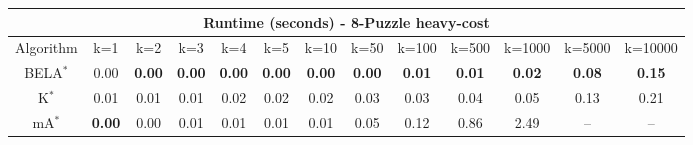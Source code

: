 \begin{tabular}{c|cccccccccccc}\toprule
\multicolumn{13}{c}{Runtime (seconds) - 8-Puzzle heavy-cost}\\ \midrule
Algorithm & k=1 & k=2 & k=3 & k=4 & k=5 & k=10 & k=50 & k=100 & k=500 & k=1000 & k=5000 & k=10000 \\ \midrule
BELA$^*$ & 0.00 & \textbf{0.00} & \textbf{0.00} & \textbf{0.00} & \textbf{0.00} & \textbf{0.00} & \textbf{0.00} & \textbf{0.01} & \textbf{0.01} & \textbf{0.02} & \textbf{0.08} & \textbf{0.15} \\
K$^*$ & 0.01 & 0.01 & 0.01 & 0.02 & 0.02 & 0.02 & 0.03 & 0.03 & 0.04 & 0.05 & 0.13 & 0.21 \\
mA$^*$ & \textbf{0.00} & 0.00 & 0.01 & 0.01 & 0.01 & 0.01 & 0.05 & 0.12 & 0.86 & 2.49 & -- & -- \\ \bottomrule 
\end{tabular}
